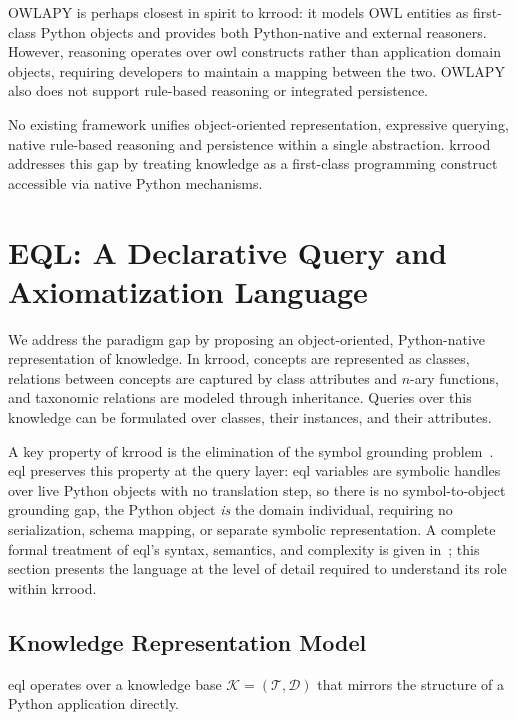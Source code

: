 \documentclass{article}
\begin{document}
OWLAPY \cite{baci2025owlapy} is perhaps closest in spirit to \ac{krrood}: it models OWL entities as first-class Python objects and provides both Python-native and external reasoners. However, reasoning operates over \ac{owl} constructs rather than application domain objects, requiring developers to maintain a mapping between the two. OWLAPY also does not support rule-based reasoning or integrated persistence. 

No existing framework unifies object-oriented representation, expressive querying, native rule-based reasoning and persistence within a single abstraction. \Ac{krrood} addresses this gap by treating knowledge as a first-class programming construct accessible via native Python mechanisms.

\section{EQL: A Declarative Query and Axiomatization Language}
\label{sec:eql}

We address the paradigm gap by proposing an object-oriented, Python-native
representation of knowledge. In \ac{krrood}, concepts are represented as
classes, relations between concepts are captured by class attributes and
$n$-ary functions, and taxonomic relations are modeled through inheritance.
Queries over this knowledge can be formulated over classes, their instances,
and their attributes.

A key property of \ac{krrood} is the elimination of the symbol grounding
problem~\cite{harnad1990symbol}. \ac{eql} preserves this property at the
query layer: \ac{eql} variables are symbolic handles over live Python objects
with no translation step, so there is no symbol-to-object grounding gap, the Python object \emph{is} the domain individual, requiring no
serialization, schema mapping, or separate symbolic representation. A complete formal treatment of \ac{eql}'s syntax,
semantics, and complexity is given in~\cite{EQLFormalization2026}; this
section presents the language at the level of detail required to understand
its role within \ac{krrood}.


\subsection{Knowledge Representation Model}
\label{ssec:eql_kb}

\ac{eql} operates over a knowledge base $\mathcal{K} = (\mathcal{T},
\mathcal{D})$ that mirrors the structure of a Python application directly.
\end{document}
